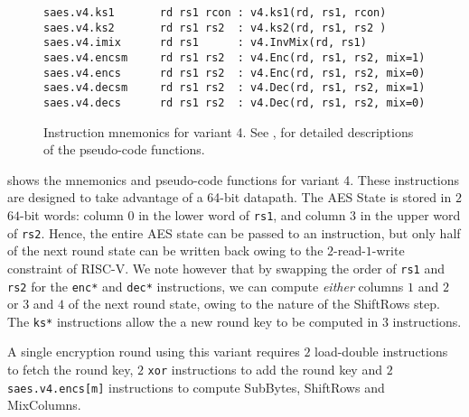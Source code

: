 
\begin{figure}
\begin{lstlisting}[language=pseudo,style=block]
saes.v4.ks1       rd rs1 rcon : v4.ks1(rd, rs1, rcon)
saes.v4.ks2       rd rs1 rs2  : v4.ks2(rd, rs1, rs2 )
saes.v4.imix      rd rs1      : v4.InvMix(rd, rs1)
saes.v4.encsm     rd rs1 rs2  : v4.Enc(rd, rs1, rs2, mix=1)
saes.v4.encs      rd rs1 rs2  : v4.Enc(rd, rs1, rs2, mix=0)
saes.v4.decsm     rd rs1 rs2  : v4.Dec(rd, rs1, rs2, mix=1)
saes.v4.decs      rd rs1 rs2  : v4.Dec(rd, rs1, rs2, mix=0)
\end{lstlisting}
\caption{
    Instruction mnemonics for variant 4.
    See ,  for detailed
    descriptions of the pseudo-code functions.
}
\label{fig:mnemonics:v4}
\end{figure}

 shows the mnemonics and pseudo-code functions
for variant 4.
These instructions are designed to take advantage of a 64-bit
datapath.
The AES State is stored in $2$ $64$-bit words: column $0$ in the
lower word of {\tt rs1}, and column $3$ in the upper word of {\tt rs2}.
Hence, the entire AES state can be passed to an instruction, but only
half of the next round state can be written back owing to the
$2$-read-$1$-write constraint of RISC-V.
We note however that by swapping the order of {\tt rs1} and {\tt rs2}
for the {\tt enc*} and {\tt dec*} instructions, we can compute {\em either}
columns $1$ and $2$ or $3$ and $4$ of the next round state, owing to
the nature of the ShiftRows step.
The {\tt ks*} instructions allow the a new round key to be computed
in $3$ instructions.

A single encryption round using this variant requires
$2$ load-double instructions to fetch the round key,
$2$ {\tt xor} instructions to add the round key
and
$2$ {\tt saes.v4.encs[m]} instructions to compute SubBytes, ShiftRows
and MixColumns.

